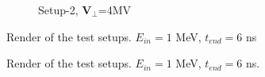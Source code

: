 \documentclass[a4paper,oneside,12pt]{report}
\numberwithin{equation}{chapter}
\begin{document}
{\begin{figure}[H]
\begin{subfigure}{0.9\textwidth}
        \caption*{Setup-2, $\textbf{V}_{\perp}$=4MV}
    \end{subfigure}
    \caption{Render of the test setups.  $E_{in}=1$ MeV, $t_{end}=6$ ns}
\end{figure} \fi
\begin{figure}[H]
    \centering
    \vspace{1pt}
    \vspace{5pt}
    \caption{Render of the test setups.  $E_{in}=1$ MeV, $t_{end}=6$ ns.}
\end{figure}

}
\end{document}
